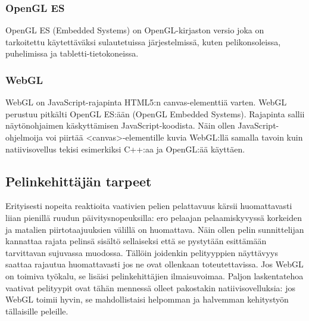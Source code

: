 \subsubsection{OpenGL ES}
OpenGL ES (Embedded Systems) on OpenGL-kirjaston versio joka on tarkoitettu käytettäväksi sulautetuissa järjestelmissä, kuten pelikonsoleissa, puhelimissa ja tabletti-tietokoneissa\cite{opengles}. 

\subsubsection{WebGL}
WebGL on JavaScript-rajapinta HTML5:n canvas-elementtiä varten. WebGL perustuu pitkälti OpenGL ES:ään (OpenGL Embedded Systems)\cite{webgl_specification}. Rajapinta sallii näytönohjaimen käskyttämisen JavaScript-koodista. Näin ollen JavaScript-ohjelmoija voi piirtää <canvas>-elementille kuvia WebGL:llä samalla tavoin kuin natiivisovellus tekisi esimerkiksi C++:aa ja OpenGL:ää käyttäen.

\subsection{Pelinkehittäjän tarpeet}
Erityisesti nopeita reaktioita vaativien pelien pelattavuus kärsii huomattavasti liian pienillä ruudun päivitysnopeuksilla: ero pelaajan pelaamiskyvyssä korkeiden ja matalien piirtotaajuuksien välillä on huomattava\cite{claypool_fps}. Näin ollen pelin sunnittelijan kannattaa rajata pelinsä sisältö sellaiseksi että se pystytään esittämään tarvittavan sujuvassa muodossa. Tällöin joidenkin pelityyppien näyttävyys saattaa rajautua huomattavasti jos ne ovat ollenkaan toteutettavissa. Jos WebGL on toimiva työkalu, se lisäisi pelinkehittäjien ilmaisuvoimaa. Paljon laskentatehoa vaativat pelityypit ovat tähän mennessä olleet pakostakin natiivisovelluksia: jos WebGL toimii hyvin, se mahdollistaisi helpomman ja halvemman kehitystyön tällaisille peleille.